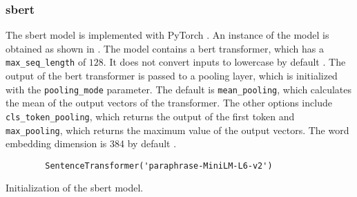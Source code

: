 \subsubsection*{\ac{sbert}}\label{subsubsec:impl-sbert}

The \ac{sbert} model is implemented with PyTorch \cite{HfsentTrans2019}.
An instance of the model is obtained as shown in .
The model contains a \ac{bert} transformer, which has a \texttt{max\_seq\_length} of $128$. 
It does not convert inputs to lowercase by default \cite{sbert-dev}.
The output of the \ac{bert} transformer is passed to a pooling layer, which is initialized with the \texttt{pooling\_mode} parameter.
The default is \texttt{mean\_pooling}, which calculates the mean of the output vectors of the transformer.
The other options include \texttt{cls\_token\_pooling}, which returns the output of the first token and 
\texttt{max\_pooling}, which returns the maximum value of the output vectors.
The word embedding dimension is 384 by default \cite{sbert-dev}.

\begin{listing}[htp]
    \begin{verbatim}
        SentenceTransformer('paraphrase-MiniLM-L6-v2')
    \end{verbatim}
    \caption[Initialization of the \acs*{sbert} model]{Initialization of the \acs*{sbert} model.
    }
    \label{lst:impl-sbert}
\end{listing}